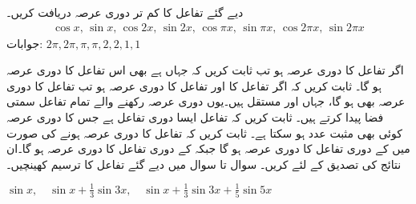 
\quad دیے گئے تفاعل کا کم تر دوری عرصہ دریافت کریں۔
\begin{align*}
\cos x,\, \sin x,\, \cos 2x,\, \sin 2x,\, \cos \pi x,\, \sin \pi x,\, \cos 2\pi x,\, \sin 2\pi x
\end{align*}
جوابات:\quad
$2\pi, 2\pi,\pi, \pi,2,2,1,1$

\quad اگر تفاعل  کا دوری عرصہ  ہو تب ثابت کریں کہ  جہاں  ہے بھی اس تفاعل کا دوری عرصہ ہو گا۔
\quad ثابت کریں کہ اگر تفاعل  کا  اور تفاعل  کا دوری عرصہ  ہو تب تفاعل  کا دوری عرصہ بھی  ہو گا، جہاں  اور  مستقل ہیں۔یوں دوری عرصہ  رکھنے والے تمام تفاعل سمتی فضا پیدا کرتے ہیں۔
\quad ثابت کریں کہ تفاعل  ایسا دوری تفاعل ہے جس کا دوری عرصہ  کوئی بھی مثبت عدد ہو سکتا ہے۔
\quad ثابت کریں کہ  تفاعل  کا دوری عرصہ  ہونے کی صورت میں  کے دوری تفاعل   کا دوری عرصہ  ہو گا جبکہ  کے دوری  تفاعل   کا دوری عرصہ  ہو گا۔ان نتائج کی تصدیق  کے لئے کریں۔ 
سوال  تا سوال  میں دیے گئے تفاعل کا ترسیم کھینچیں۔

\quad
$\sin x,\quad \sin x+\frac{1}{3}\sin 3x,\quad \sin x+\frac{1}{3}\sin 3x+\frac{1}{5}\sin 5x$

